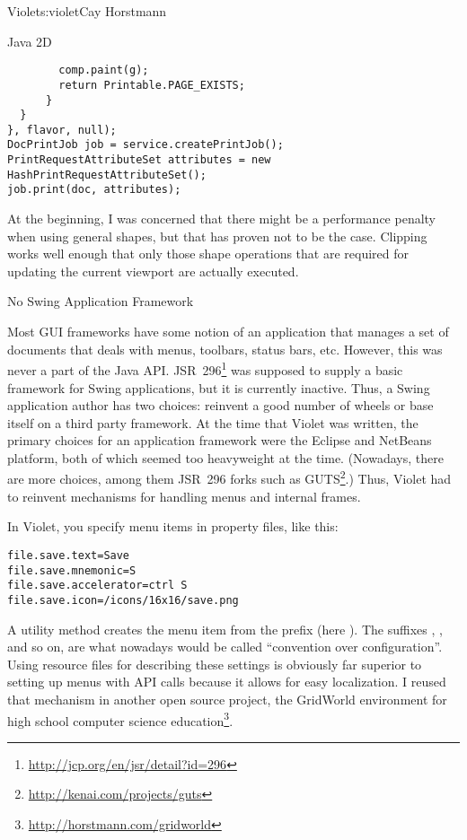 \begin{aosachapter}{Violet}{s:violet}{Cay Horstmann}
\begin{aosasect1}{Java 2D}
\begin{verbatim}
        comp.paint(g);
        return Printable.PAGE_EXISTS;
      }
  }
}, flavor, null);
DocPrintJob job = service.createPrintJob();
PrintRequestAttributeSet attributes = new HashPrintRequestAttributeSet();
job.print(doc, attributes);
\end{verbatim}

At the beginning, I was concerned that there might be a performance
penalty when using general shapes, but that has proven not to be the
case. Clipping works well enough that only those shape operations
that are required for updating the current viewport are actually
executed.

\end{aosasect1}

\begin{aosasect1}{No Swing Application Framework}

Most GUI frameworks have some notion of an application that manages a
set of documents that deals with menus, toolbars, status bars,
etc. However, this was never a part of the Java
API\@. JSR~296\footnote{\url{http://jcp.org/en/jsr/detail?id=296}} was
supposed to supply a basic framework for Swing applications, but it is
currently inactive.  Thus, a Swing application author has two choices:
reinvent a good number of wheels or base itself on a third party
framework. At the time that Violet was written, the primary choices
for an application framework were the Eclipse and NetBeans platform,
both of which seemed too heavyweight at the time. (Nowadays, there are
more choices, among them JSR~296 forks such as
GUTS\footnote{\url{http://kenai.com/projects/guts}}.)  Thus, Violet
had to reinvent mechanisms for handling menus and internal frames.

In Violet, you specify menu items in property files, like this:

\begin{verbatim}
file.save.text=Save
file.save.mnemonic=S
file.save.accelerator=ctrl S
file.save.icon=/icons/16x16/save.png
\end{verbatim}

\noindent A utility method creates the menu item from the prefix (here
). The suffixes , , and so
on, are what nowadays would be called ``convention over
configuration''.  Using resource files for describing these settings
is obviously far superior to setting up menus with API calls because
it allows for easy localization. I reused that mechanism in another
open source project, the GridWorld environment for high school
computer science
education\footnote{\url{http://horstmann.com/gridworld}}.


\end{aosasect1}
\end{aosachapter}
